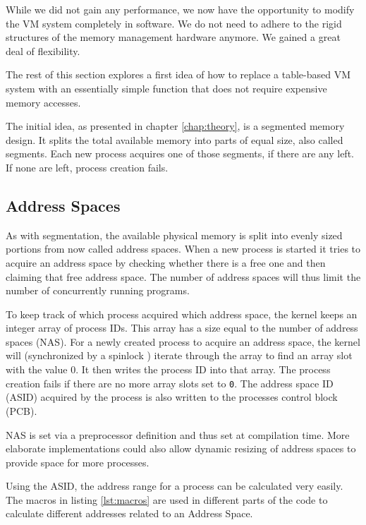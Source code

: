 While we did not gain any performance, we now have the opportunity to modify the VM system
completely in software. We do not need to adhere to the rigid structures \cite{tanenbaumOS} of the memory management hardware anymore.
We gained a great deal of flexibility.

The rest of this section explores a first idea of how to replace a table-based VM system with an essentially simple function that does not require expensive memory accesses.

The initial idea, as presented in chapter \cref{chap:theory}, is a segmented memory design. It splits the total
available memory into parts of equal size, also called segments.
Each new process acquires one of those segments, if there are any left. If none are left, process creation fails.

\subsection{Address Spaces}
As with segmentation, the available physical memory is split into evenly sized portions \cite{tanenbaumOS}from now called address spaces. When a new process is started it tries to acquire an address space by
checking whether there is a free one and then claiming that free address space.
The number of address spaces will thus limit the number of concurrently running programs.

To keep track of which process acquired which address space, the kernel keeps an integer array of process IDs.
This array has a size equal to the number of address spaces (NAS).
For a newly created process to acquire an address space, the kernel will (synchronized by a spinlock \cite{cox2011xv6})
iterate through the array to find an array slot with the value 0. It then writes the process ID into that array.
The process creation fails if there are no more array slots set to \texttt{0}.
The address space ID (ASID) acquired by the process is also written to the processes control block (PCB).

NAS is set via a preprocessor definition and thus set at compilation time. More elaborate implementations
could also allow dynamic resizing of address spaces to provide space for more processes.

Using the ASID, the address range for a process can be calculated very easily. The macros in listing \ref{lst:macros}
are used in different parts of the code to calculate different addresses related to an Address Space.

